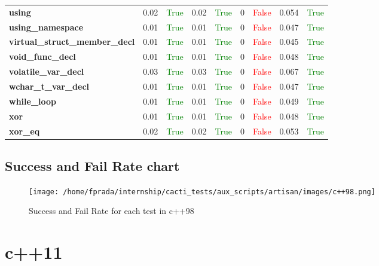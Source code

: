 \documentclass{article}
\begin{document}
\begin{xltabular}{\textwidth}{lcccccccc}
\textbf{{\fontsize{10}{12}\selectfont using}}& 0.02&\textcolor{green}{True}& 0.02&\textcolor{green}{True}& 0&\textcolor{red}{False}& 0.054&\textcolor{green}{True} \\[0.5ex]
\textbf{{\fontsize{10}{12}\selectfont using\_namespace}}& 0.01&\textcolor{green}{True}& 0.01&\textcolor{green}{True}& 0&\textcolor{red}{False}& 0.047&\textcolor{green}{True} \\[0.5ex]
\textbf{{\fontsize{10}{12}\selectfont virtual\_struct\_member\_decl}}& 0.01&\textcolor{green}{True}& 0.01&\textcolor{green}{True}& 0&\textcolor{red}{False}& 0.045&\textcolor{green}{True} \\[0.5ex]
\textbf{{\fontsize{10}{12}\selectfont void\_func\_decl}}& 0.01&\textcolor{green}{True}& 0.01&\textcolor{green}{True}& 0&\textcolor{red}{False}& 0.048&\textcolor{green}{True} \\[0.5ex]
\textbf{{\fontsize{10}{12}\selectfont volatile\_var\_decl}}& 0.03&\textcolor{green}{True}& 0.03&\textcolor{green}{True}& 0&\textcolor{red}{False}& 0.067&\textcolor{green}{True} \\[0.5ex]
\textbf{{\fontsize{10}{12}\selectfont wchar\_t\_var\_decl}}& 0.01&\textcolor{green}{True}& 0.01&\textcolor{green}{True}& 0&\textcolor{red}{False}& 0.047&\textcolor{green}{True} \\[0.5ex]
\textbf{{\fontsize{10}{12}\selectfont while\_loop}}& 0.01&\textcolor{green}{True}& 0.01&\textcolor{green}{True}& 0&\textcolor{red}{False}& 0.049&\textcolor{green}{True} \\[0.5ex]
\textbf{{\fontsize{10}{12}\selectfont xor}}& 0.01&\textcolor{green}{True}& 0.01&\textcolor{green}{True}& 0&\textcolor{red}{False}& 0.048&\textcolor{green}{True} \\[0.5ex]
\textbf{{\fontsize{10}{12}\selectfont xor\_eq}}& 0.02&\textcolor{green}{True}& 0.02&\textcolor{green}{True}& 0&\textcolor{red}{False}& 0.053&\textcolor{green}{True} \\[0.5ex]
\bottomrule
\end{xltabular}
\newpage
\subsection{Success and Fail Rate chart}
\begin{figure}[h!]
\centering
\texttt{[image: /home/fprada/internship/cacti\_tests/aux\_scripts/artisan/images/c++98.png]}
\caption{Success and Fail Rate for each test in c++98}
\label{fig:c++98}
\end{figure}
\newpage
\section{c++11}
\end{document}

